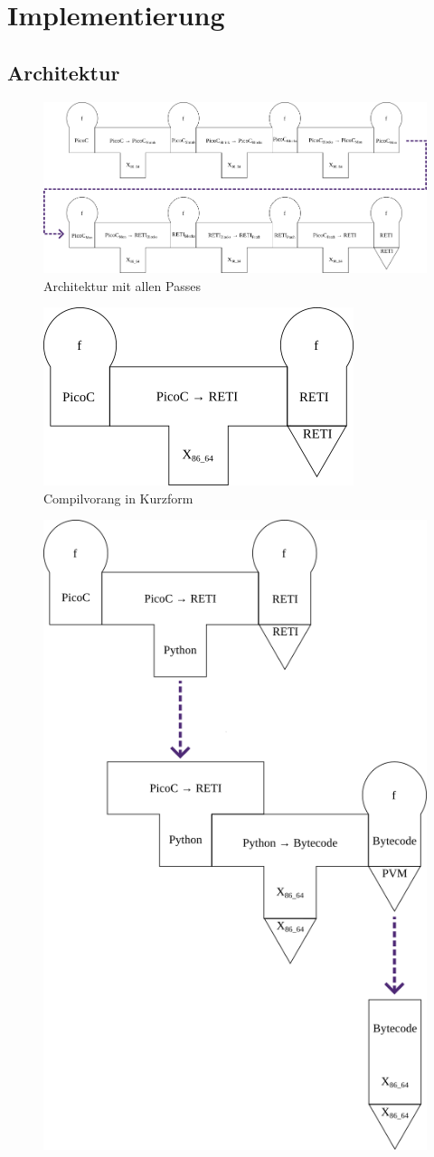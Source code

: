 
\chapter{Implementierung}
\label{ch:implementierung}
\section{Architektur}

\begin{figure}[H]
  \centering
  \includegraphics[width=\linewidth]{./figures/passes.png}
  \caption{Architektur mit allen Passes}
\end{figure}

\begin{figure}[H]
  \centering
  \includegraphics[width=0.33\linewidth]{./figures/compiliervorang_mit_machiene.png}
  \caption{Compilvorang in Kurzform}
\end{figure}

\begin{figure}[H]
  \centering
  \includegraphics[width=0.5\linewidth]{./figures/summarized_cross_compiler.png}
  \caption{}
\end{figure}

